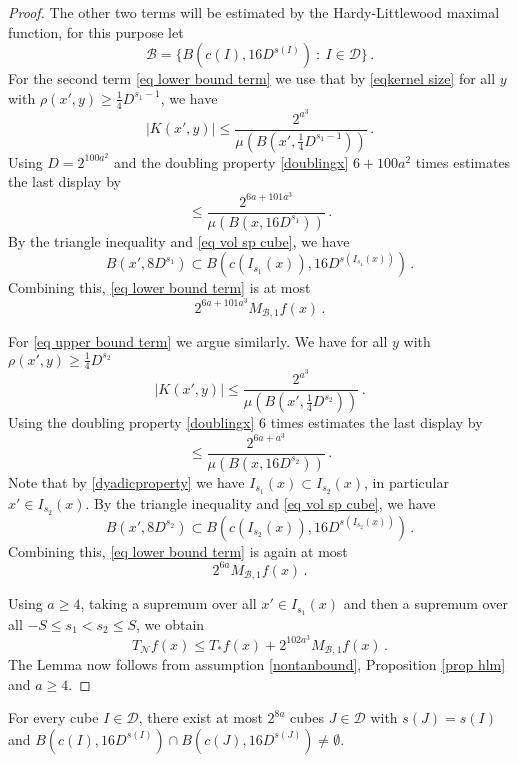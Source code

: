 \begin{proof}
    The other two terms will be estimated by the Hardy-Littlewood maximal function, for this purpose let
    $$
        \mathcal{B} = \{B(c(I), 16D^{s(I)}) \ : \ I \in \mathcal{D}\}\,.
    $$
    For the second term \eqref{eq lower bound term} we use that by \eqref{eqkernel size} for all $y$ with $\rho(x', y) \ge \frac{1}{4}D^{s_1 - 1}$, we have
    $$
        |K(x', y)| \le \frac{2^{a^3}}{\mu(B(x', \frac{1}{4}D^{s_1 - 1}))}\,.
    $$
    Using $D=2^{100a^2}$
    and the doubling property \eqref{doublingx} $6 +100a^2$ times estimates
    the last display by
    \begin{equation}
        \le \frac{2^{6a+101a^3}}{\mu(B(x,  16D^{s_1}))}\, .
    \end{equation}
    By the triangle inequality and \eqref{eq vol sp cube}, we have
    $$
        B(x', 8D^{s_1}) \subset B(c(I_{s_1}(x)), 16D^{s(I_{s_1}(x))})\,.
    $$
    Combining this, \eqref{eq lower bound term} is at most
    $$
        2^{6a + 101a^3} M_{\mathcal{B},1} f(x)\,.
    $$

    For \eqref{eq upper bound term} we argue similarly. We have for all $y$ with $\rho(x', y) \ge \frac{1}{4}D^{s_2}$
    $$
        |K(x', y)| \le \frac{2^{a^3}}{\mu(B(x', \frac{1}{4}D^{s_2}))}\,.
    $$
    Using the doubling property \eqref{doublingx} $6$ times estimates
    the last display by
    \begin{equation}
        \le \frac{2^{6a + a^3}}{\mu(B(x,  16 D^{s_2}))}\, .
    \end{equation}
    Note that by \eqref{dyadicproperty} we have $I_{s_1}(x) \subset I_{s_2}(x)$, in particular $x' \in I_{s_2}(x)$.
    By the triangle inequality and \eqref{eq vol sp cube}, we have
    $$
        B(x', 8D^{s_2}) \subset B(c(I_{s_2}(x)), 16D^{s(I_{s_2}(x))})\,.
    $$
    Combining this, \eqref{eq lower bound term} is again at most
    $$
        2^{6a} M_{\mathcal{B},1} f(x)\,.
    $$

    Using $a \ge 4$, taking a supremum over all $x' \in I_{s_1}(x)$ and then a supremum over all $-S \le s_1 < s_2 \le S$, we obtain
    $$
        T_{\mathcal{N}} f(x) \le T_*f(x) + 2^{102a^3}  M_{\mathcal{B},1} f(x)\,.
    $$
    The Lemma now follows from assumption \eqref{nontanbound}, Proposition \ref{prop hlm} and $a \ge 4$.
\end{proof}

\begin{lemma}
    \label{lem aux overlap}
    For every cube $I \in \mathcal{D}$, there exist at most $2^{8a}$ cubes $J \in \mathcal{D}$ with $s(J) = s(I)$ and $B(c(I), 16D^{s(I)}) \cap B(c(J), 16 D^{s(J)}) \ne \emptyset$.
\end{lemma}

